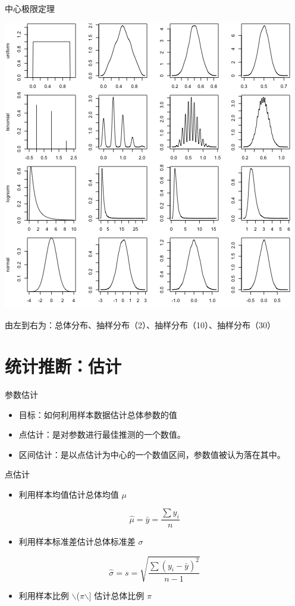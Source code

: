 \documentclass[presentation]{beamer}
\begin{document}
\begin{frame}[fragile,label={sec:org96f6152}]{中心极限定理}
\begin{center}
\includegraphics[width=.9\linewidth]{2.png}
\end{center}

由左到右为：总体分布、抽样分布（2）、抽样分布（10）、抽样分布（30）
\end{frame}


\section{统计推断：估计}
\label{sec:org754f3c9}
\begin{frame}[label={sec:org468541a}]{参数估计}
\begin{itemize}
\item 目标：如何利用样本数据估计总体参数的值
\item 点估计：是对参数进行最佳推测的一个数值。
\item 区间估计：是以点估计为中心的一个数值区间，参数值被认为落在其中。
\end{itemize}
\end{frame}

\begin{frame}[label={sec:org6a9b3dd}]{点估计}
\begin{itemize}
\item 利用样本均值估计总体均值 \(\mu\)
\end{itemize}
\[\hat \mu=\bar y=\frac{\sum y_i}{n}\]

\begin{itemize}
\item 利用样本标准差估计总体标准差 \(\sigma\)
\end{itemize}
\[\hat \sigma=s=\sqrt{\frac{\sum (y_i-\bar y)^2}{n-1}}\]
\begin{itemize}
\item 利用样本比例 $\backslash$(\hat \(\pi\)$\backslash$] 估计总体比例 \(\pi\)
\end{itemize}
\end{frame}
\end{document}
